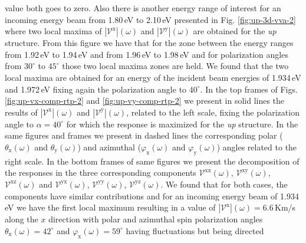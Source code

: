 \documentclass[prb,11pt,tightenlines,twocolumn,aps]{revtex4-1}
\begin{document}
value both goes to zero.
Also there is another energy range of interest for an incoming energy beam from
1.80\,eV to 2.10\,eV presented in Fig. \ref{fig:up-3d-vva-2} where two local
maxima of $|\mathcal{V}^{\mathrm{x}}|(\omega)$ and
$|\mathcal{V}^{\mathrm{y}}|(\omega)$ are obtained for the \emph{up} structure.
% 
From this figure we have that for the zone between the energy ranges from
1.92\,eV to 1.94\,eV and from 1.96\,eV to 1.98\,eV and for polarization angles
from $30^{\circ}$ to $45^{\circ}$ those two local maxima zones are held.
% 
We found that the two local maxima are obtained for an energy of the incident
beam energies of 1.934\,eV and 1.972\,eV fixing again the polarization angle to
$40^{\circ}$. 
In the top frames of Figs. \ref{fig:up-vx-comp-rtp-2} and 
% 
\ref{fig:up-vy-comp-rtp-2} we present in solid lines the results of
$|\mathcal{V}^{\mathrm{x}}|(\omega)$ and $|\mathcal{V}^{\mathrm{y}}|(\omega)$,
related to the left scale, fixing the polarization angle to $\alpha=40^{\circ}$
for which the response is maximized for the \emph{up} structure. In the same
figures and frames we present in dashed lines the corresponding polar
($\theta_{\mathrm{x}}(\omega)$ and $\theta_{\mathrm{y}}(\omega)$) and azimuthal
($\varphi_{\mathrm{x}}(\omega)$ and $\varphi_{\mathrm{y}}(\omega)$) angles
related to the right scale. In the bottom frames of same figures we present the
decomposition of the responses in the three corresponding components
$\mathcal{V}^{\mathrm{xx}}(\omega)$, $\mathcal{V}^{\mathrm{xy}}(\omega)$,
$\mathcal{V}^{\mathrm{xz}}(\omega)$ and $\mathcal{V}^{\mathrm{yx}}(\omega)$,
$\mathcal{V}^{\mathrm{yy}}(\omega)$, $\mathcal{V}^{\mathrm{yz}}(\omega)$. 
% 
We found that for both cases, the components have similar contributions and for
an incoming energy beam of 1.934\,eV  we have the first local maximum resulting
in a value of $|\mathcal{V}^{\mathrm{x}}|(\omega)= 6.6$\,Km/s along the $x$
direction  with polar and azimuthal spin polarization angles
$\theta_{\mathrm{x}}(\omega)= 42^{\circ}$ and
$\varphi_{\mathrm{x}}(\omega)=59^{\circ}$ having fluctuations but being directed
\end{document}
